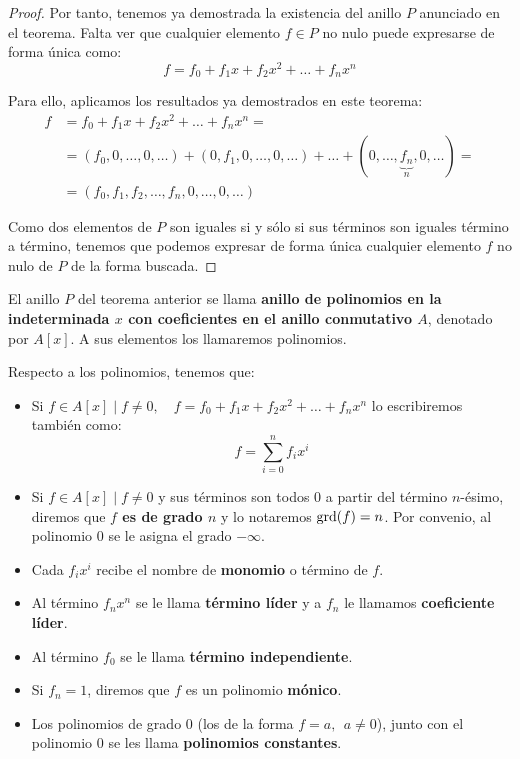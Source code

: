\begin{proof}
    Por tanto, tenemos ya demostrada la existencia del anillo $P$ anunciado en el teorema. Falta ver que cualquier elemento $f \in P$ no nulo puede expresarse de forma única como:
    $$f = f_0 + f_1x + f_2x^2 + \ldots + f_n x^n$$

    Para ello, aplicamos los resultados ya demostrados en este teorema:
    \begin{equation*}
        \begin{split}
            f
            &= f_0 + f_1x + f_2x^2 + \ldots + f_n x^n = \\
            & = (f_0, 0, \ldots, 0, \ldots) + (0, f_1, 0, \ldots, 0, \ldots) + \ldots + (0, \ldots, \underbrace{f_n}_n, 0, \ldots) = \\
            & = (f_0, f_1, f_2, \ldots, f_n, 0, \ldots, 0, \ldots)
        \end{split}
    \end{equation*}
    
    Como dos elementos de $P$ son iguales si y sólo si sus términos son iguales término a término, tenemos que podemos expresar de forma única cualquier elemento $f$ no nulo de $P$ de la forma buscada.
\end{proof}

\begin{definicion}
    El anillo $P$ del teorema anterior se llama \textbf{anillo de polinomios en la indeterminada $x$ con coeficientes en el anillo conmutativo $A$}, denotado por $A[x]$. A sus elementos los llamaremos polinomios.
\end{definicion}

Respecto a los polinomios, tenemos que:
\begin{itemize}
    \item Si $f \in A[x] \mid f \neq 0 , \quad f = f_0 + f_1x + f_2 x^2 + \ldots + f_n x^n$ lo escribiremos también como:
    $$f = \sum_{i=0}^n f_i x^i$$

    \item Si $f \in A[x] \mid f\neq 0$ y sus términos son todos 0 a partir del término $n$-ésimo, diremos que \textbf{$f$ es de grado $n$} y lo notaremos $\operatorname{grd}(f) = n$. Por convenio, al polinomio 0 se le asigna el grado $-\infty$.

    \item Cada $f_i x^i$ recibe el nombre de \textbf{monomio} o término de $f$.

    \item Al término $f_n x^n$ se le llama \textbf{término líder} y a $f_n$ le llamamos \textbf{coeficiente líder}.

    \item  Al término $f_0$ se le llama \textbf{término independiente}.

    \item Si $f_n = 1$, diremos que $f$ es un polinomio \textbf{mónico}.

    \item Los polinomios de grado 0 (los de la forma $f=a,~~a \neq 0$), junto con el polinomio 0 se les llama \textbf{polinomios constantes}.
\end{itemize}

